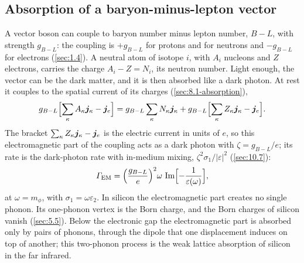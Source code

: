 \subsection{Absorption of a baryon-minus-lepton vector}\label{sec:11.6-bl}

A vector boson can couple to baryon number minus lepton number, $B - L$, with strength $g_{B-L}$: the coupling is $+g_{B-L}$ for protons and for neutrons and $-g_{B-L}$ for electrons (\cref{sec:1.4}). A neutral atom of isotope $i$, with $A_i$ nucleons and $Z$ electrons, carries the charge $A_i - Z = N_i$, its neutron number. Light enough, the vector can be the dark matter, and it is then absorbed like a dark photon. At rest it couples to the spatial current of its charges (\cref{sec:8.1-absorption}),
\begin{equation*}
  g_{B-L}\Bigl[\sum_\kappa A_\kappa\bm{j}_\kappa - \bm{j}_e\Bigr] = g_{B-L}\sum_\kappa N_\kappa\bm{j}_\kappa + g_{B-L}\Bigl[\sum_\kappa Z_\kappa\bm{j}_\kappa - \bm{j}_e\Bigr] .
\end{equation*}
The bracket $\sum_\kappa Z_\kappa\bm{j}_\kappa - \bm{j}_e$ is the electric current in units of $e$, so this electromagnetic part of the coupling acts as a dark photon with $\zeta = g_{B-L}/e$; its rate is the dark-photon rate with in-medium mixing, $\zeta^2\sigma_1/|\varepsilon|^2$ (\cref{sec:10.7}):
\begin{equation}
  \varGamma_{\mathrm{EM}} = \Bigl(\frac{g_{B-L}}{e}\Bigr)^2\omega\,\operatorname{Im}\Bigl[-\frac{1}{\varepsilon(\omega)}\Bigr] ,
  \label{eq:11.6-GEM}
\end{equation}
at $\omega = m_\phi$, with $\sigma_1 = \omega\varepsilon_2$. In silicon the electromagnetic part creates no single phonon. Its one-phonon vertex is the Born charge, and the Born charges of silicon vanish (\cref{sec:5.5}). Below the electronic gap the electromagnetic part is absorbed only by pairs of phonons, through the dipole that one displacement induces on top of another; this two-phonon process is the weak lattice absorption of silicon in the far infrared.

